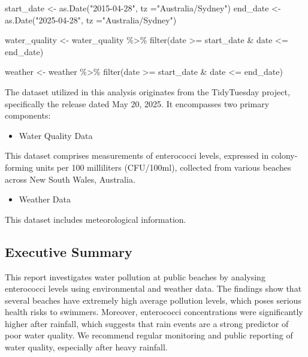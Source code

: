 \documentclass[
  11pt,
]{article}
\newenvironment{Shaded}{\begin{snugshade}}{\end{snugshade}}
\newcommand{\AttributeTok}[1]{\textcolor[rgb]{0.40,0.45,0.13}{#1}}
\newcommand{\FunctionTok}[1]{\textcolor[rgb]{0.28,0.35,0.67}{#1}}
\newcommand{\NormalTok}[1]{\textcolor[rgb]{0.00,0.23,0.31}{#1}}
\newcommand{\OtherTok}[1]{\textcolor[rgb]{0.00,0.23,0.31}{#1}}
\newcommand{\SpecialCharTok}[1]{\textcolor[rgb]{0.37,0.37,0.37}{#1}}
\newcommand{\StringTok}[1]{\textcolor[rgb]{0.13,0.47,0.30}{#1}}
\providecommand{\tightlist}{%
  \setlength{\itemsep}{0pt}\setlength{\parskip}{0pt}}\usepackage{longtable,booktabs,array}
\begin{document}
\begin{Shaded}
\begin{Highlighting}[]
\NormalTok{start\_date }\OtherTok{\textless{}{-}} \FunctionTok{as.Date}\NormalTok{(}\StringTok{"2015{-}04{-}28"}\NormalTok{, }\AttributeTok{tz =}\StringTok{"Australia/Sydney"}\NormalTok{)}
\NormalTok{end\_date }\OtherTok{\textless{}{-}} \FunctionTok{as.Date}\NormalTok{(}\StringTok{"2025{-}04{-}28"}\NormalTok{, }\AttributeTok{tz =}\StringTok{"Australia/Sydney"}\NormalTok{)}

\NormalTok{water\_quality }\OtherTok{\textless{}{-}}\NormalTok{ water\_quality }\SpecialCharTok{\%\textgreater{}\%}
  \FunctionTok{filter}\NormalTok{(date }\SpecialCharTok{\textgreater{}=}\NormalTok{ start\_date }\SpecialCharTok{\&}\NormalTok{ date }\SpecialCharTok{\textless{}=}\NormalTok{ end\_date)}

\NormalTok{weather }\OtherTok{\textless{}{-}}\NormalTok{ weather }\SpecialCharTok{\%\textgreater{}\%}
  \FunctionTok{filter}\NormalTok{(date }\SpecialCharTok{\textgreater{}=}\NormalTok{ start\_date }\SpecialCharTok{\&}\NormalTok{ date }\SpecialCharTok{\textless{}=}\NormalTok{ end\_date)}
\end{Highlighting}
\end{Shaded}

The dataset utilized in this analysis originates from the TidyTuesday
project, specifically the release dated May 20, 2025. It encompasses two
primary components:

\begin{itemize}
\tightlist
\item
  Water Quality Data
\end{itemize}

This dataset comprises measurements of enterococci levels, expressed in
colony-forming units per 100 milliliters (CFU/100ml), collected from
various beaches across New South Wales, Australia.

\begin{itemize}
\tightlist
\item
  Weather Data
\end{itemize}

This dataset includes meteorological information.

\subsection{Executive Summary}\label{executive-summary}

This report investigates water pollution at public beaches by analysing
enterococci levels using environmental and weather data. The findings
show that several beaches have extremely high average pollution levels,
which poses serious health risks to swimmers. Moreover, enterococci
concentrations were significantly higher after rainfall, which suggests
that rain events are a strong predictor of poor water quality. We
recommend regular monitoring and public reporting of water quality,
especially after heavy rainfall.
\end{document}
